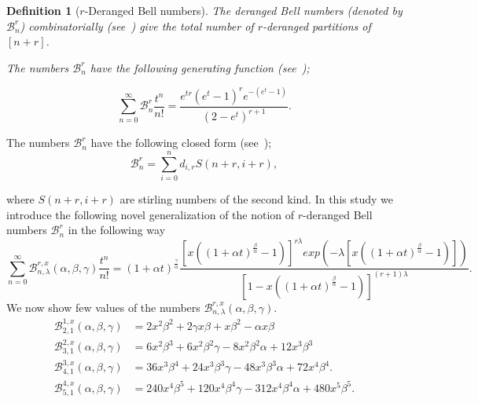 \documentclass[12pt]{amsart}
\newtheorem{proof 1}{proof 1}
\newtheorem{definition}{Definition}[section]
\begin{document}
\begin{definition}[$r$-Deranged Bell \label{defintion:100} numbers\cite{belbachir2023deranged}]The deranged Bell numbers  (denoted by $\mathcal{B}^{r}_{n}$) combinatorially  (see~\cite{belbachir2023deranged}) give the total number of $r$-deranged partitions of $[n+r]$. 
	
	The numbers  $\mathcal{B}^{r}_{n}$ have the following generating function (see~\cite{belbachir2023deranged});
	
	\begin{equation}\label{equation:2}
		\sum_{n=0}^{\infty}\mathcal{B}^{r}_{n}\frac{t^n}{n!}=\frac{e^{tr}(e^t-1)^re^{-(e^t-1)}}{(2-e^t)^{r+1}}.
\end{equation}\end{definition}

 The numbers   $\mathcal{B}^{r}_{n}$ have the following closed form (see~\cite{belbachir2023deranged});
\begin{equation}
	\mathcal{B}^{r}_{n}=\sum\limits_{i=0}^nd_{i,r}S(n+r,i+r),
\end{equation}

where $S(n+r,i+r)$ are stirling numbers of the second kind. In this study we introduce the following novel generalization of the notion of $r$-deranged Bell numbers $\mathcal{B}^{r}_{n}$
in the following way
\begin{equation}\label{equation:4}
	\sum\limits_{n=0}^{\infty}\mathcal{B}^{r,x}_{n,\lambda}(\alpha,\beta,\gamma)\frac{t^n}{n!}=(1+\alpha t)^{\frac{\gamma}{\alpha}}\frac{[x((1+\alpha t)^\frac{\beta}{\alpha}-1)]^{r\lambda}exp(-\lambda[x((1+\alpha t)^\frac{\beta}{\alpha}-1)])}{[1-x((1+\alpha t)^\frac{\beta}{\alpha}-1)]^{(r+1)\lambda}}.
\end{equation}
We now show few values of the numbers $\mathcal{B}^{r,x}_{n,\lambda}(\alpha,\beta,\gamma)$.
\begin{align*}
	\mathcal{B}^{1,x}_{2,1}(\alpha,\beta,\gamma)&=2x^2\beta^2+2\gamma x\beta+x\beta^2-\alpha x\beta\\
		\mathcal{B}^{2,x}_{3,1}(\alpha,\beta,\gamma)&=6x^2\beta^3+6x^2\beta^2\gamma-8x^2\beta^2\alpha+12x^3\beta^3\\
	\mathcal{B}^{3,x}_{4,1}(\alpha,\beta,\gamma)&=36x^3\beta^4+24x^3\beta^3\gamma-48x^3\beta^3\alpha+72x^4\beta^4.\\
		\mathcal{B}^{4,x}_{5,1}(\alpha,\beta,\gamma)&=240x^4\beta^5+120x^4\beta^4\gamma-312x^4\beta^4\alpha+480x^5\beta^5.
\end{align*}
\end{document}
